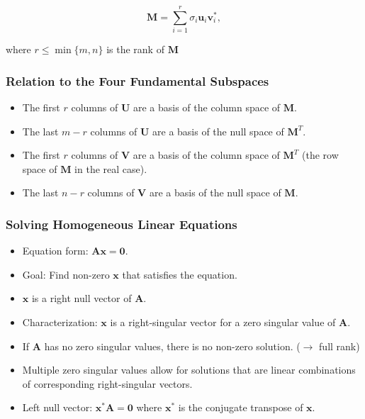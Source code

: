 \documentclass[8pt, a4paper, landscape, includeheadfoot]{extarticle}
\begin{document}
\begin{multicols*}{4}
\begin{itemize}[itemsep=0pt, leftmargin=8pt]
		      $$
			      \mathbf{M} = \sum_{i=1}^{r}\sigma_i\mathbf{u}_i\mathbf{v}_i^{*},
		      $$

		      where $r \leq \min\{m,n\}$ is the rank of $\mathbf M$
	\end{itemize}

	\subsubsection{Relation to the Four Fundamental Subspaces}{}

	\begin{itemize}[itemsep=0pt, leftmargin=8pt]
		\item The first \( r \) columns of \( \mathbf{U} \) are a basis of the column space of \( \mathbf{M} \).
		\item The last \( m-r \) columns of \( \mathbf{U} \) are a basis of the null space of \( \mathbf{M}^T \).
		\item The first \( r \) columns of \( \mathbf{V} \) are a basis of the column space of \( \mathbf{M}^T \) (the row space of \( \mathbf{M} \) in the real case).
		\item The last \( n-r \) columns of \( \mathbf{V} \) are a basis of the null space of \( \mathbf{M} \).
	\end{itemize}

	\Umbruch

	\subsubsection{Solving Homogeneous Linear Equations}{}
	\begin{itemize}[itemsep=0pt, leftmargin=8pt]
		\item Equation form: \( \mathbf{A} \mathbf{x} = \mathbf{0} \).
		\item Goal: Find non-zero \( \mathbf{x} \) that satisfies the equation.
		\item \( \mathbf{x} \) is a right null vector of \( \mathbf{A} \).
		\item Characterization: \( \mathbf{x} \) is a right-singular vector for a zero singular value of \( \mathbf{A} \).
		\item If \( \mathbf{A} \) has no zero singular values, there is no non-zero solution. ($\to$ full rank)
		\item Multiple zero singular values allow for solutions that are linear combinations of corresponding right-singular vectors.
		\item Left null vector: \( \mathbf{x}^* \mathbf{A} = \mathbf{0} \) where \( \mathbf{x}^* \) is the conjugate transpose of \( \mathbf{x} \).
	\end{itemize}


\end{multicols*}
\end{document}
